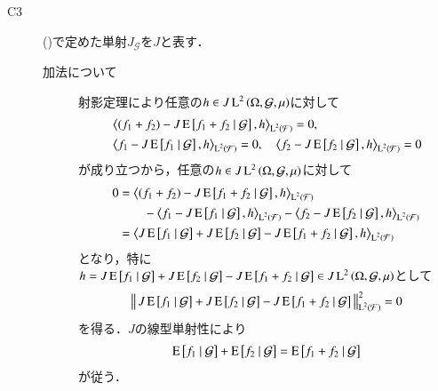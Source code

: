 \begin{prf}
\begin{description}
			\item[C3] ()で定めた単射$J_{\mathcal{G}}$を$J$と表す．
				\begin{description}
					\item[加法について]
						射影定理により任意の$h \in J \operatorname{L}^{2} \left(\Omega, \mathcal{G},\mu\right)$に対して
						\begin{align}
							&\inprod<(f_1 + f_2) - J\cexp{f_1 + f_2}{\mathcal{G}}, h>_{\Lp{2}{\mathcal{F}}} = 0, \\
							&\inprod<f_1 - J\cexp{f_1}{\mathcal{G}}, h>_{\Lp{2}{\mathcal{F}}} = 0
							,\quad \inprod<f_2 - J\cexp{f_2}{\mathcal{G}}, h>_{\Lp{2}{\mathcal{F}}} = 0
						\end{align}
						が成り立つから，任意の$h \in J\operatorname{L}^{2} \left(\Omega, \mathcal{G},\mu\right)$に対して
						\begin{align}
							0 &= \inprod<(f_1 + f_2) - J\cexp{f_1 + f_2}{\mathcal{G}}, h>_{\Lp{2}{\mathcal{F}}} \\
								&\qquad- \inprod<f_1 - J\cexp{f_1}{\mathcal{G}}, h>_{\Lp{2}{\mathcal{F}}} - \inprod<f_2 - J\cexp{f_2}{\mathcal{G}}, h>_{\Lp{2}{\mathcal{F}}} \\
							&= \inprod<J\cexp{f_1}{\mathcal{G}} + J\cexp{f_2}{\mathcal{G}} - J\cexp{f_1 + f_2}{\mathcal{G}}, h>_{\Lp{2}{\mathcal{F}}}
						\end{align}
						となり，特に$h = J\operatorname{E} \left[ f_1 \ \middle|\ \mathcal{G} \right] + J\operatorname{E} \left[ f_2 \ \middle|\ \mathcal{G} \right] - J\operatorname{E} \left[ f_1 + f_2 \ \middle|\ \mathcal{G} \right] \in J\operatorname{L}^{2} \left(\Omega, \mathcal{G},\mu\right)$として
						\begin{align}
							\left\|\, J\operatorname{E} \left[ f_1 \ \middle|\ \mathcal{G} \right] + J\operatorname{E} \left[ f_2 \ \middle|\ \mathcal{G} \right] - J\operatorname{E} \left[ f_1 + f_2 \ \middle|\ \mathcal{G} \right]\, \right\|_{\operatorname{L}^{2} \left(\mathcal{F}\right)}^2 = 0
						\end{align}
						を得る．$J$の線型単射性により
						\begin{align}
							\operatorname{E} \left[ f_1 \ \middle|\ \mathcal{G} \right] + \operatorname{E} \left[ f_2 \ \middle|\ \mathcal{G} \right] = \operatorname{E} \left[ f_1 + f_2 \ \middle|\ \mathcal{G} \right]
						\end{align}
						が従う．
						

\end{description}
\end{description}
\end{prf}
